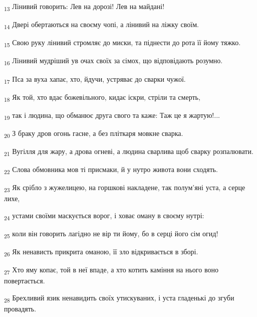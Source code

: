 \begin{tcolorbox}
\textsubscript{13} Лінивий говорить: Лев на дорозі! Лев на майдані!
\end{tcolorbox}
\begin{tcolorbox}
\textsubscript{14} Двері обертаються на своєму чопі, а лінивий на ліжку своїм.
\end{tcolorbox}
\begin{tcolorbox}
\textsubscript{15} Свою руку лінивий стромляє до миски, та піднести до рота її йому тяжко.
\end{tcolorbox}
\begin{tcolorbox}
\textsubscript{16} Лінивий мудріший ув очах своїх за сімох, що відповідають розумно.
\end{tcolorbox}
\begin{tcolorbox}
\textsubscript{17} Пса за вуха хапає, хто, йдучи, устряває до сварки чужої.
\end{tcolorbox}
\begin{tcolorbox}
\textsubscript{18} Як той, хто вдає божевільного, кидає іскри, стріли та смерть,
\end{tcolorbox}
\begin{tcolorbox}
\textsubscript{19} так і людина, що обманює друга свого та каже: Таж це я жартую!...
\end{tcolorbox}
\begin{tcolorbox}
\textsubscript{20} З браку дров огонь гасне, а без пліткаря мовкне сварка.
\end{tcolorbox}
\begin{tcolorbox}
\textsubscript{21} Вугілля для жару, а дрова огневі, а людина сварлива щоб сварку розпалювати.
\end{tcolorbox}
\begin{tcolorbox}
\textsubscript{22} Слова обмовника мов ті присмаки, й у нутро живота вони сходять.
\end{tcolorbox}
\begin{tcolorbox}
\textsubscript{23} Як срібло з жужелицею, на горшкові накладене, так полум'яні уста, а серце лихе,
\end{tcolorbox}
\begin{tcolorbox}
\textsubscript{24} устами своїми маскується ворог, і ховає оману в своєму нутрі:
\end{tcolorbox}
\begin{tcolorbox}
\textsubscript{25} коли він говорить лагідно не вір ти йому, бо в серці його сім огид!
\end{tcolorbox}
\begin{tcolorbox}
\textsubscript{26} Як ненависть прикрита оманою, її зло відкривається в зборі.
\end{tcolorbox}
\begin{tcolorbox}
\textsubscript{27} Хто яму копає, той в неї впаде, а хто котить каміння на нього воно повертається.
\end{tcolorbox}
\begin{tcolorbox}
\textsubscript{28} Брехливий язик ненавидить своїх утискуваних, і уста гладенькі до згуби провадять.
\end{tcolorbox}
